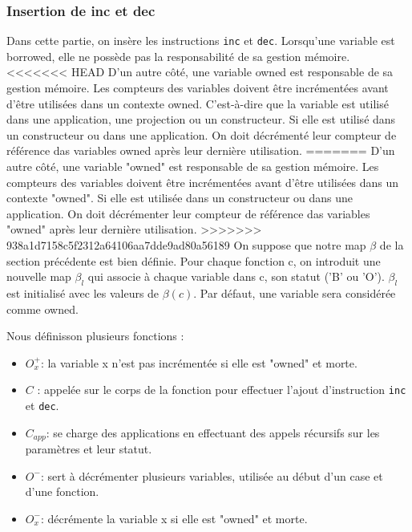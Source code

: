 \documentclass{rapportECL}
\begin{document}
\subsubsection{Insertion de inc et dec}
Dans cette partie, on insère les instructions \verb|inc| et \verb|dec|.
Lorsqu'une variable est borrowed, elle ne possède pas la responsabilité de sa gestion mémoire. 
<<<<<<< HEAD
D'un autre côté, une variable owned est responsable de sa gestion mémoire.
Les compteurs des variables doivent être incrémentées avant d'être utilisées dans un contexte owned. 
C'est-à-dire que la variable est utilisé dans une application, une projection ou un constructeur.
Si elle est utilisé dans un constructeur ou dans une application.
On doit décrémenté leur compteur de référence das variables owned après leur dernière utilisation. 
=======
D'un autre côté, une variable "owned" est responsable de sa gestion mémoire.
Les compteurs des variables doivent être incrémentées avant d'être utilisées dans un contexte "owned". 
Si elle est utilisée dans un constructeur ou dans une application.
On doit décrémenter leur compteur de référence das variables "owned" après leur dernière utilisation. 
>>>>>>> 938a1d7158c5f2312a64106aa7dde9ad80a56189
On suppose que notre map $\beta$ de la section précédente est bien définie. 
Pour chaque fonction c, on introduit une nouvelle map $\beta_l$ qui associe à chaque variable dans c, son statut ('B' ou 'O'). 
$\beta_l$ est initialisé avec les valeurs de $\beta(c)$. Par défaut, une variable sera considérée comme owned.

Nous définisson plusieurs fonctions :
\begin{itemize}
    \item $O_x^{+}$: la variable x n'est pas incrémentée si elle est "owned" et morte.
    \item $C$ : appelée sur le corps de la fonction pour effectuer l'ajout d'instruction \verb|inc| et \verb|dec|.
    \item $C_{app}$: se charge des applications en effectuant des appels récursifs sur les paramètres et leur statut.
    \item $O^{-}$: sert à décrémenter plusieurs variables, utilisée au début d'un case et d'une fonction.
    \item  $O_x^{-}$: décrémente la variable x si elle est "owned" et morte.   
\end{itemize}

\end{document}
